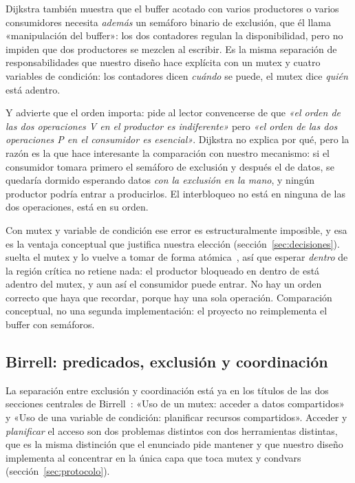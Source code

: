 Dijkstra también muestra que el buffer acotado con varios productores o
varios consumidores necesita \emph{además} un semáforo binario de exclusión,
que él llama «manipulación del buffer»: los dos contadores regulan la
disponibilidad, pero no impiden que dos productores se mezclen al escribir.
Es la misma separación de responsabilidades que nuestro diseño hace explícita
con un mutex y cuatro variables de condición:
los contadores dicen \emph{cuándo} se puede, el mutex dice \emph{quién} está
adentro.

Y advierte que el orden importa: pide al lector convencerse de que \emph{«el
orden de las dos operaciones V en el productor es indiferente»} pero
\emph{«el orden de las dos operaciones P en el consumidor es esencial»}.
Dijkstra no explica por qué, pero la razón es la que hace interesante la
comparación con nuestro mecanismo: si el consumidor
tomara primero el semáforo de exclusión y después el de datos, se quedaría
dormido esperando datos \emph{con la exclusión en la mano}, y ningún
productor podría entrar a producirlos. El interbloqueo no está en ninguna de
las dos operaciones, está en su orden.

Con mutex y variable de condición ese error es estructuralmente imposible, y
esa es la ventaja conceptual que justifica nuestra elección
(sección~\ref{sec:decisiones}).
 suelta el mutex y lo vuelve a tomar de forma
atómica~\cite{POSIX2024}, así que esperar \emph{dentro} de la región crítica
no retiene nada: el productor bloqueado en  dentro de
 está adentro del mutex, y aun así el consumidor puede
entrar. No hay un orden correcto que haya que recordar, porque hay una sola
operación. Comparación conceptual, no una segunda implementación: el
proyecto no reimplementa el buffer con semáforos.

\subsection{Birrell: predicados, exclusión y coordinación}

La separación entre exclusión y coordinación está ya en los títulos de las
dos secciones centrales de Birrell~\cite{Birrell1989}: «Uso de un mutex:
acceder a datos compartidos» y «Uso de una variable de condición: planificar
recursos compartidos». Acceder y \emph{planificar} el acceso son dos
problemas distintos con dos herramientas distintas, que es la misma
distinción que el enunciado pide mantener y que nuestro diseño implementa al
concentrar en  la única capa que toca mutex y condvars
(sección~\ref{sec:protocolo}).

